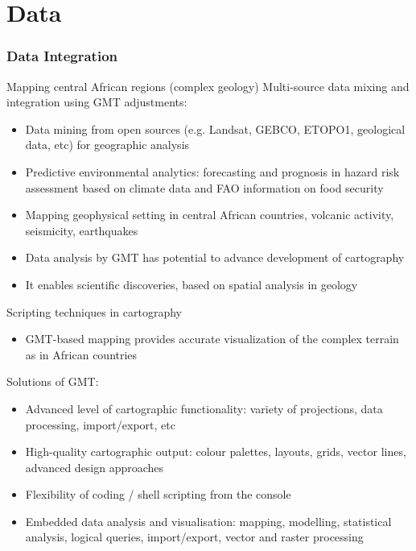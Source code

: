 \documentclass[pdflatex,compress,8pt,
	xcolor={dvipsnames,dvipsnames,svgnames,x11names,table},
	hyperref={colorlinks = true, breaklinks = true, urlcolor = NavyBlue, linkcolor=white, breaklinks = true}]{beamer}
\begin{document}
\section{Data}
\begin{frame}\frametitle{Data Integration}
 
\begin{alertblock}{Mapping central African regions (complex geology)}
Multi-source data mixing and integration using GMT adjustments:
 \begin{itemize}\footnotesize
     \item Data mining from open sources (e.g. Landsat, GEBCO, ETOPO1, geological data, etc) for geographic analysis 
     \item Predictive environmental analytics: forecasting and prognosis in hazard risk assessment based on climate data and FAO information on food security
     \item Mapping geophysical setting in central African countries, volcanic activity, seismicity, earthquakes
     \item Data analysis by GMT has potential to advance development of cartography
     \item It enables scientific discoveries, based on spatial analysis in geology
\end{itemize}
\end{alertblock}

\begin{exampleblock}{Scripting techniques in cartography}
\begin{itemize}\footnotesize
        	\item GMT-based mapping provides accurate visualization of the complex terrain as in African countries
\end{itemize}
\end{exampleblock}
	
\begin{alertblock}{Solutions of GMT:}\footnotesize
 \begin{itemize}
     \item Advanced level of cartographic functionality: variety of projections, data processing, import/export, etc
     \item High-quality cartographic output: colour palettes, layouts, grids, vector lines, advanced design approaches
     \item Flexibility of coding / shell scripting from the console
     \item Embedded data analysis and visualisation: mapping, modelling, statistical analysis, logical queries, import/export, vector and raster processing
\end{itemize}
\end{alertblock}
\end{frame}
\end{document}
